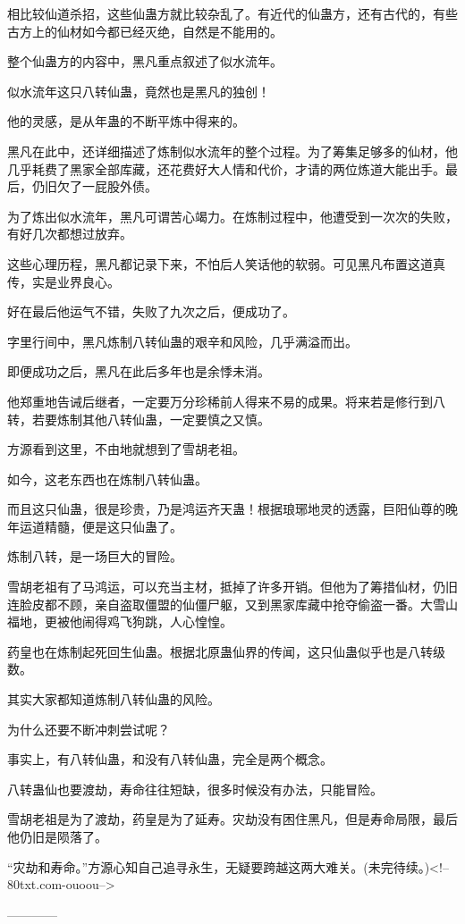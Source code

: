 \begin{this_body}
相比较仙道杀招，这些仙蛊方就比较杂乱了。有近代的仙蛊方，还有古代的，有些古方上的仙材如今都已经灭绝，自然是不能用的。

整个仙蛊方的内容中，黑凡重点叙述了似水流年。

似水流年这只八转仙蛊，竟然也是黑凡的独创！

他的灵感，是从年蛊的不断平炼中得来的。

黑凡在此中，还详细描述了炼制似水流年的整个过程。为了筹集足够多的仙材，他几乎耗费了黑家全部库藏，还花费好大人情和代价，才请的两位炼道大能出手。最后，仍旧欠了一屁股外债。

为了炼出似水流年，黑凡可谓苦心竭力。在炼制过程中，他遭受到一次次的失败，有好几次都想过放弃。

这些心理历程，黑凡都记录下来，不怕后人笑话他的软弱。可见黑凡布置这道真传，实是业界良心。

好在最后他运气不错，失败了九次之后，便成功了。

字里行间中，黑凡炼制八转仙蛊的艰辛和风险，几乎满溢而出。

即便成功之后，黑凡在此后多年也是余悸未消。

他郑重地告诫后继者，一定要万分珍稀前人得来不易的成果。将来若是修行到八转，若要炼制其他八转仙蛊，一定要慎之又慎。

方源看到这里，不由地就想到了雪胡老祖。

如今，这老东西也在炼制八转仙蛊。

而且这只仙蛊，很是珍贵，乃是鸿运齐天蛊！根据琅琊地灵的透露，巨阳仙尊的晚年运道精髓，便是这只仙蛊了。

炼制八转，是一场巨大的冒险。

雪胡老祖有了马鸿运，可以充当主材，抵掉了许多开销。但他为了筹措仙材，仍旧连脸皮都不顾，亲自盗取僵盟的仙僵尸躯，又到黑家库藏中抢夺偷盗一番。大雪山福地，更被他闹得鸡飞狗跳，人心惶惶。

药皇也在炼制起死回生仙蛊。根据北原蛊仙界的传闻，这只仙蛊似乎也是八转级数。

其实大家都知道炼制八转仙蛊的风险。

为什么还要不断冲刺尝试呢？

事实上，有八转仙蛊，和没有八转仙蛊，完全是两个概念。

八转蛊仙也要渡劫，寿命往往短缺，很多时候没有办法，只能冒险。

雪胡老祖是为了渡劫，药皇是为了延寿。灾劫没有困住黑凡，但是寿命局限，最后他仍旧是陨落了。

“灾劫和寿命。”方源心知自己追寻永生，无疑要跨越这两大难关。(未完待续。)<!--80txt.com-ouoou-->

------------

\end{this_body}

